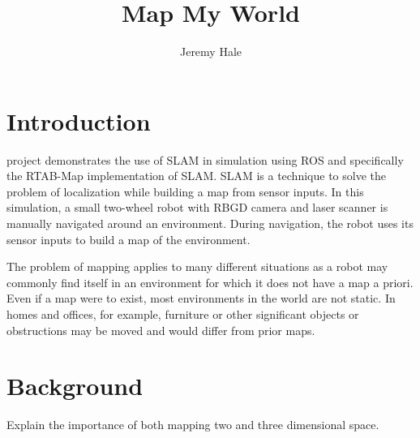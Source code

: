 \documentclass[10pt,journal,compsoc]{IEEEtran}
\begin{document}
\title{Map My World}

\author{Jeremy Hale}

%
{}


\maketitle
\IEEEdisplaynontitleabstractindextext
\IEEEpeerreviewmaketitle
\section{Introduction}
\label{sec:introduction}

 project demonstrates the use of SLAM in simulation using ROS and specifically the RTAB-Map implementation of SLAM. SLAM is a technique to solve the problem of localization while building a map from sensor inputs. In this simulation, a small two-wheel robot with RBGD camera and laser scanner is manually navigated around an environment. During navigation, the robot uses its sensor inputs to build a map of the environment.

The problem of mapping applies to many different situations as a robot may commonly find itself in an environment for which it does not have a map a priori. Even if a map were to exist, most environments in the world are not static. In homes and offices, for example, furniture or other significant objects or obstructions may be moved and would differ from prior maps.

\section{Background}
Explain the importance of both mapping two and three dimensional space.
\end{document}
